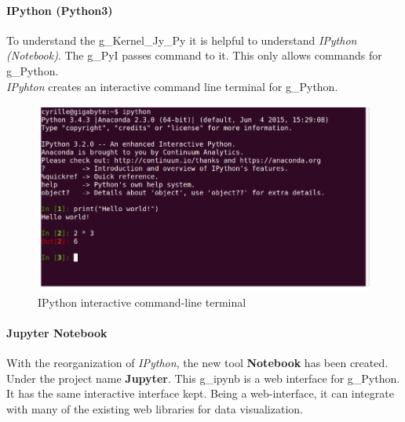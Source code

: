 \paragraph{IPython (Python3)}
To understand the \gls{g_Kernel_Jy_Py} it is helpful to understand \textit{IPython (Notebook)}. The \gls{g_PyI} passes command to it. This only allows commands for \gls{g_Python}.\\


\textit{IPyhton} creates an interactive command line terminal for \gls{g_Python}.  

\begin{figure}[H]
	\centering
	\includegraphics[scale = 0.3]{attachment/chapter_AML/Scc005}
	\caption{IPython interactive command-line terminal}
\end{figure}

\paragraph{Jupyter Notebook}
With the reorganization of \textit{IPython}, the new tool \textbf{Notebook} has been created. Under the project name \textbf{Jupyter}. This \gls{g_ipynb} is a web interface for \gls{g_Python}. It has the same interactive interface kept. Being a web-interface, it can integrate with many of the existing web libraries for data visualization.\\

